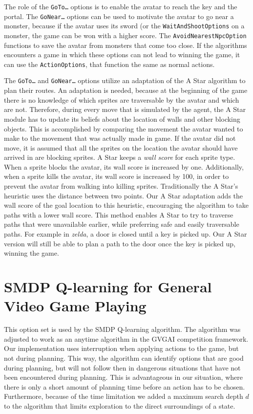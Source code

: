 The role of the \texttt{GoTo\ldots} options is to enable the avatar to reach the
key and the portal. The \texttt{GoNear\ldots} options can be used to motivate
the avatar to go near a monster, because if the avatar uses its sword (or the
\texttt{WaitAndShootOptions} on a monster, the game can be won with a higher
score. The \texttt{AvoidNearestNpcOption} functions to save the avatar from
monsters that come too close. If the algorithms encounters a game in which these
options can not lead to winning the game, it can use the \texttt{ActionOptions},
that function the same as normal actions.

The \texttt{GoTo\ldots} and \texttt{GoNear\ldots} options utilize an adaptation
of the A Star algorithm to plan their routes. An adaptation is needed, because
at the beginning of the game there is no knowledge of which sprites are
traversable by the avatar and which are not. Therefore, during every move that
is simulated by the agent, the A Star module has to update its beliefs about the
location of walls and other blocking objects. This is accomplished by comparing
the movement the avatar wanted to make to the movement that was actually made in
game. If the avatar did not move, it is assumed that all the sprites on the
location the avatar should have arrived in are blocking sprites. A Star keeps a
\emph{wall score} for each sprite type. When a sprite blocks the avatar, its
wall score is increased by one. Additionally, when a sprite kills the avatar,
its wall score is increased by 100, in order to prevent the avatar from walking
into killing sprites.  Traditionally the A Star's heuristic uses the distance
between two points. Our A Star adaptation adds the wall score of the goal
location to this heuristic, encouraging the algorithm to take paths with a lower
wall score. This method enables A Star to try to traverse paths that were
unavailable earlier, while preferring safe and easily traversable paths. For
example in \textit{zelda}, a door is closed until a key is picked up. Our A Star
version will still be able to plan a path to the door once the key is picked up,
winning the game.


\section{SMDP Q-learning for General Video Game Playing}
\label{subsec:smdp-qlearning-gvgp}

This option set is used by the SMDP Q-learning algorithm. The algorithm was
adjusted to work as an anytime algorithm in the GVGAI competition framework.
Our implementation uses interruption when applying actions to the game, but not
during planning. This way, the algorithm can identify options that are good
during planning, but will not follow then in dangerous situations that have not
been encountered during planning. This is advantageous in our situation, where
there is only a short amount of planning time before an action has to be chosen.
Furthermore, because of the time limitation we added a maximum search depth $d$
to the algorithm that limits exploration to the direct surroundings of a state.

